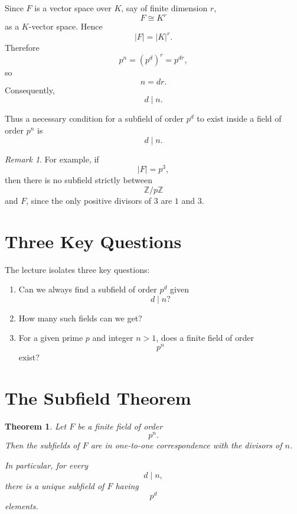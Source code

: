 \documentclass[11pt]{article}
\newtheorem{theorem}{Theorem}[section]
\theoremstyle{remark}
\newtheorem*{remark}{Remark}
\newcommand{\Z}{\mathbb Z}
\begin{document}
Since $F$ is a vector space over $K$, say of finite dimension $r$,
\[
    F\cong K^r
\]
as a $K$-vector space. Hence
\[
    |F|=|K|^r.
\]
Therefore
\[
    p^n=(p^d)^r=p^{dr},
\]
so
\[
    n=dr.
\]
Consequently,
\[
    \boxed{d\mid n.}
\]

Thus a necessary condition for a subfield of order $p^d$ to exist inside
a field of order $p^n$ is
\[
    d\mid n.
\]

\begin{remark}
For example, if
\[
    |F|=p^3,
\]
then there is no subfield strictly between
\[
    \Z/p\Z
\]
and $F$, since the only positive divisors of $3$ are $1$ and $3$.
\end{remark}

\section{Three Key Questions}

The lecture isolates three key questions:

\begin{enumerate}[label=\arabic*.]
    \item Can we always find a subfield of order $p^d$ given
    \[
        d\mid n?
    \]

    \item How many such fields can we get?

    \item For a given prime $p$ and integer $n>1$, does a finite field
    of order
    \[
        p^n
    \]
    exist?
\end{enumerate}

\section{The Subfield Theorem}

\begin{theorem}
Let $F$ be a finite field of order
\[
    p^n.
\]
Then the subfields of $F$ are in one-to-one correspondence with the
divisors of $n$.

In particular, for every
\[
    d\mid n,
\]
there is a unique subfield of $F$ having
\[
    p^d
\]
elements.
\end{theorem}
\end{document}
